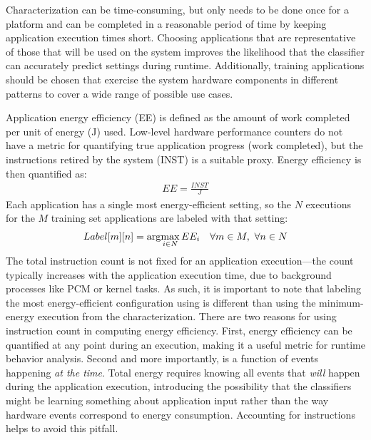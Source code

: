Characterization can be time-consuming, but only needs to be done once for a platform and can be completed in a reasonable period of time by keeping application execution times short.
Choosing applications that are representative of those that will be used on the system improves the likelihood that the classifier can accurately predict settings during runtime.
Additionally, training applications should be chosen that exercise the system hardware components in different patterns to cover a wide range of possible use cases.

Application energy efficiency (EE) is defined as the amount of work completed per unit of energy (J) used.
Low-level hardware performance counters do not have a metric for quantifying true application progress (work completed), but the instructions retired by the system (INST) is a suitable proxy.
Energy efficiency is then quantified as:
\begin{eqnarray}
EE = \frac{INST}{J}
\label{eqn:ee}
\end{eqnarray}
Each application has a single most energy-efficient setting, so the $N$ executions for the $M$ training set applications are labeled with that setting:
\begin{eqnarray}
Label[m][n] = \arg\!\max_{i \in N}EE_i \,\,\,\,\,\,\forall m \in M,\,\,\forall n \in N
\label{eqn:label}
\end{eqnarray}
The total instruction count is not fixed for an application execution---the count typically increases with the application execution time, \eg due to background processes like PCM or kernel tasks.
As such, it is important to note that labeling the most energy-efficient configuration using  is different than using the minimum-energy execution from the characterization.
There are two reasons for using instruction count in computing energy efficiency.
First, energy efficiency can be quantified at any point during an execution, making it a useful metric for runtime behavior analysis.
Second and more importantly,  is a function of events happening \emph{at the time}.
Total energy requires knowing all events that \emph{will} happen during the application execution, introducing the possibility that the classifiers might be learning something about application input rather than the way hardware events correspond to energy consumption.
Accounting for instructions helps to avoid this pitfall.


